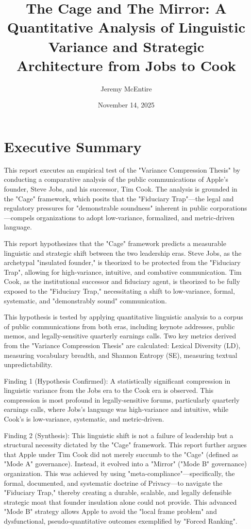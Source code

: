 \documentclass[12pt]{article}
\title{The Cage and The Mirror: A Quantitative Analysis of Linguistic Variance and Strategic Architecture from Jobs to Cook}
\author{Jeremy McEntire}
\date{November 14, 2025}
\begin{document}
\maketitle

\section{Executive Summary}

This report executes an empirical test of the "Variance Compression Thesis" by conducting a comparative analysis of the public communications of Apple's founder, Steve Jobs, and his successor, Tim Cook. The analysis is grounded in the "Cage" framework, which posits that the "Fiduciary Trap"—the legal and regulatory pressures for "demonstrable soundness" inherent in public corporations—compels organizations to adopt low-variance, formalized, and metric-driven language.

This report hypothesizes that the "Cage" framework predicts a measurable linguistic and strategic shift between the two leadership eras. Steve Jobs, as the archetypal "insulated founder," is theorized to be protected from the "Fiduciary Trap", allowing for high-variance, intuitive, and combative communication. Tim Cook, as the institutional successor and fiduciary agent, is theorized to be fully exposed to the "Fiduciary Trap," necessitating a shift to low-variance, formal, systematic, and "demonstrably sound" communication.

This hypothesis is tested by applying quantitative linguistic analysis to a corpus of public communications from both eras, including keynote addresses, public memos, and legally-sensitive quarterly earnings calls. Two key metrics derived from the "Variance Compression Thesis" are calculated: Lexical Diversity (LD), measuring vocabulary breadth, and Shannon Entropy (SE), measuring textual unpredictability.

Finding 1 (Hypothesis Confirmed): A statistically significant compression in linguistic variance from the Jobs era to the Cook era is observed. This compression is most profound in legally-sensitive forums, particularly quarterly earnings calls, where Jobs's language was high-variance and intuitive, while Cook's is low-variance, systematic, and metric-driven.

Finding 2 (Synthesis): This linguistic shift is not a failure of leadership but a structural necessity dictated by the "Cage" framework. This report further argues that Apple under Tim Cook did not merely succumb to the "Cage" (defined as "Mode A" governance). Instead, it evolved into a "Mirror" ("Mode B" governance) organization. This was achieved by using "meta-compliance"—specifically, the formal, documented, and systematic doctrine of Privacy—to navigate the "Fiduciary Trap," thereby creating a durable, scalable, and legally defensible strategic moat that founder insulation alone could not provide. This advanced "Mode B" strategy allows Apple to avoid the "local frame problem" and dysfunctional, pseudo-quantitative outcomes exemplified by "Forced Ranking".
\end{document}
